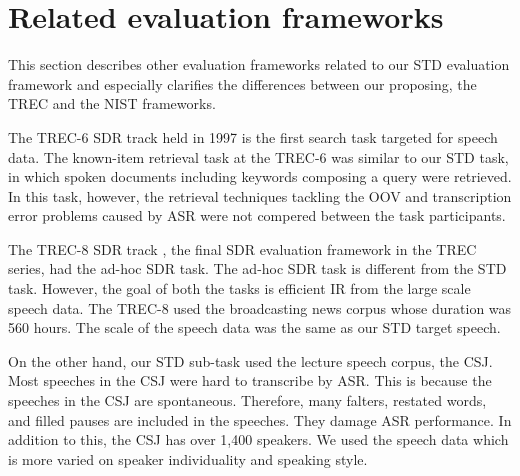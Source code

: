 \documentclass[english]{jnlp_1.4}
\begin{document}
\section{Related evaluation frameworks} 
\label{sec:related}

This section describes other evaluation frameworks related to our 
STD evaluation framework and especially clarifies 
the differences between our proposing, the TREC and the NIST frameworks.

The TREC-6 SDR track \cite{TREC6} held in 1997 is the first search task
targeted for speech data.
The known-item retrieval task at the TREC-6 was similar to our STD task,
in which spoken documents including keywords composing a query were
retrieved. In this task, however, the retrieval techniques tackling the
OOV and transcription error problems caused by ASR were not compered
between the task participants. 

The TREC-8 SDR track \cite{TREC}, the final SDR evaluation framework in
the TREC series, had the ad-hoc SDR task.
The ad-hoc SDR task is different from the STD task. However, the goal of
both the tasks is efficient IR from 
the large scale speech data. 
The TREC-8 used the broadcasting news corpus whose duration was 560
hours. The scale of the speech data was the same as our STD target
speech. 

On the other hand, our STD sub-task used the lecture speech corpus, the
CSJ. Most speeches in the CSJ were hard to transcribe by ASR.
This is because the speeches in the CSJ are spontaneous. 
Therefore, many falters,
restated words, and filled pauses are included in the speeches. 
They damage ASR performance. 
In addition to this, the CSJ has over 1,400 speakers. 
We used the speech data which is more varied on speaker individuality
and speaking style. 
\end{document}
